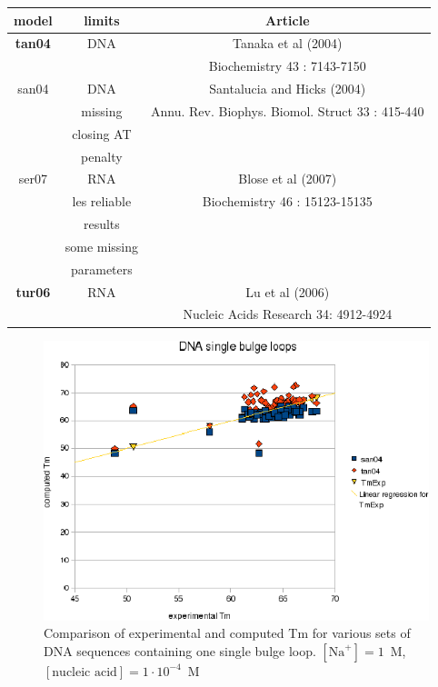 \documentclass{article}
\begin{document}
\begin{table}[hc]
\begin{tabular}[h]{| c | c | c |}
\textbf{model} & \textbf{limits} & \textbf{Article} \\
\hline
\textbf{tan04} & DNA & Tanaka et al (2004)\\
 & & Biochemistry 43 : 7143-7150 \\
\hline
san04 & DNA & Santalucia and Hicks (2004)\\
 & missing & Annu. Rev. Biophys. Biomol. Struct 33 : 415-440\\
 & closing AT & \\
 & penalty & \\
 \hline
ser07 & RNA & Blose et al (2007)\\
 & les reliable & Biochemistry 46 : 15123-15135 \\
 & results & \\
 & some missing & \\
 & parameters & \\
 \hline
\textbf{tur06} & RNA & Lu et al (2006)\\
 & & Nucleic Acids Research 34: 4912-4924 \\
\hline
\end{tabular}
\end{table}

\begin{figure}[h]
\includegraphics[width=1\linewidth]{images/DNASingleBulgeLoop}
\caption{Comparison of experimental and computed Tm for various sets of DNA sequences containing one single bulge loop. $[\mbox{Na}^+] = 1$~M, $[\mbox{nucleic acid}] = 1\cdot{}10^{-4}$~M}
\end{figure}
\end{document}
